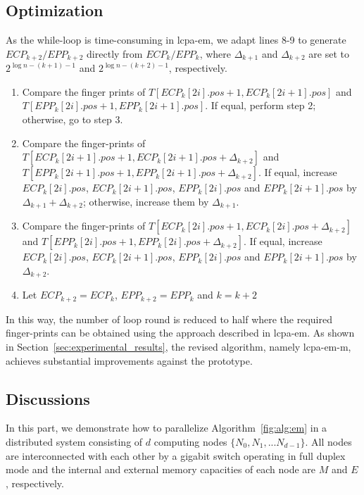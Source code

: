 \documentclass{llncs}
\begin{document}
\subsection{Optimization}\label{subsec:optimization}

As the while-loop is time-consuming in {lcpa-em}, we adapt lines 8-9 to generate $ECP_{k+2}/EPP_{k+2}$ directly from $ECP_k/EPP_k$, where $\Delta_{k+1}$ and $\Delta_{k+2}$ are set to $2^{\log n - (k+1) - 1}$ and $2^{\log n - (k+2) - 1}$, respectively.

\begin{enumerate}[S1.]
\item Compare the finger prints of $T[ECP_k[2i].pos+1,ECP_k[2i+1].pos]$ and $T[EPP_k[2i].pos+1,EPP_k[2i+1].pos]$. If equal, perform step 2; otherwise, go to step 3.
\item Compare the finger-prints of $T[ECP_k[2i+1].pos+1,ECP_k[2i+1].pos+\Delta_{k+2}]$ and $T[EPP_k[2i+1].pos+1,EPP_k[2i+1].pos+\Delta_{k+2}]$. If equal, increase $ECP_k[2i].pos$, $ECP_k[2i+1].pos$, $EPP_k[2i].pos$ and $EPP_k[2i+1].pos$ by $\Delta_{k+1}+\Delta_{k+2}$; otherwise, increase them by $\Delta_{k+1}$.
\item Compare the finger-prints of $T[ECP_k[2i].pos+1,ECP_k[2i].pos+\Delta_{k+2}]$ and $T[EPP_k[2i].pos+1,EPP_k[2i].pos+\Delta_{k+2}]$. If equal, increase $ECP_k[2i].pos$, $ECP_k[2i+1].pos$, $EPP_k[2i].pos$ and $EPP_k[2i+1].pos$ by $\Delta_{k+2}$.
\item Let $ECP_{k+2}=ECP_{k}$, $EPP_{k+2}=EPP_{k}$ and $k = k+2$
\end{enumerate}

In this way, the number of loop round is reduced to half where the required finger-prints can be obtained using the approach described in {lcpa-em}. As shown in Section~\ref{sec:experimental_results}, the revised algorithm, namely {lcpa-em-m}, achieves substantial improvements against the prototype.

\subsection{Discussions}\label{subsec:discussions}

In this part, we demonstrate how to parallelize Algorithm~\ref{fig:alg:em} in a distributed system consisting of $d$ computing nodes $\{N_0, N_1, ...N_{d-1}\}$. All nodes are interconnected with each other by a gigabit switch operating in full duplex mode and the internal and external memory capacities of each node are $M$ and $E$, respectively.
\end{document}
